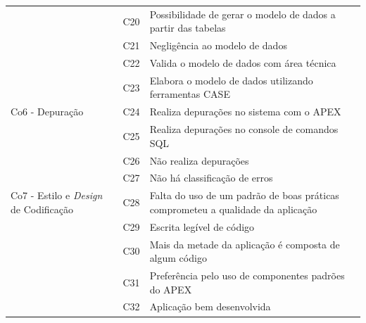 \begin{longtable}{|M{4.0cm} | M{1.3cm}| m{9.5cm}|}
                                                      & C20            & Possibilidade de gerar o modelo de dados a partir das tabelas                     \\ 
                                                      & C21            & Negligência ao modelo de dados                                                    \\ 
                                                      & C22            & Valida o modelo de dados com área técnica                                         \\ 
                                                      & C23            & Elabora o modelo de dados utilizando ferramentas CASE                             \\ \hline
Co6 - Depuração                      & C24            & Realiza depurações no sistema com o APEX                                          \\ 
                                                      & C25            & Realiza depurações no console de comandos SQL                                     \\ 
                                                      & C26            & Não realiza depurações                                                            \\ 
                                                      & C27            & Não há classificação de erros                                                     \\ \hline
Co7 - Estilo e \textit{Design} \newline de Codificação & C28            & Falta do uso de um padrão de boas práticas comprometeu a qualidade da aplicação   \\ 
                                                      & C29            & Escrita legível de código                                                         \\ 
                                                      & C30            & Mais da metade da aplicação é composta de algum código                            \\ 
                                                      & C31            & Preferência pelo uso de componentes padrões do APEX                               \\ 
                                                      & C32            & Aplicação bem desenvolvida                                                        \\ 

\end{longtable}

